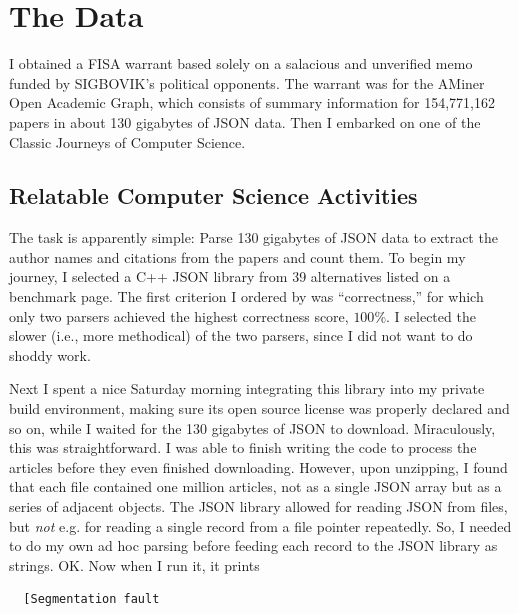 \documentclass[twocolumn]{article}
\begin{document}
\section{The Data}

I obtained a FISA warrant based solely on a salacious and unverified
memo funded by SIGBOVIK's political opponents. The warrant was for the
AMiner Open Academic Graph, which consists of summary information for
154,771,162 papers in about 130 gigabytes of JSON data. Then I embarked
on one of the Classic Journeys of Computer Science.

\subsection{Relatable Computer Science Activities}

The task is apparently simple: Parse 130 gigabytes of JSON data to
extract the author names and citations from the papers and count them.
To begin my journey, I selected a C++ JSON library from 39
alternatives listed on a benchmark page.\cite{yip2018native} The first
criterion I ordered by was ``correctness,'' for which only two parsers
achieved the highest correctness score, $100\%$. I selected the slower
(i.e., more methodical) of the two parsers, since I did not want to do
shoddy work.

Next I spent a nice Saturday morning integrating this library into my
private build environment, making sure its open source license was
properly declared and so on, while I waited for the 130 gigabytes of
JSON to download. Miraculously, this was straightforward. I was able
to finish writing the code to process the articles before they even
finished downloading. However, upon unzipping, I found that each file
contained one million articles, not as a single JSON array but as a
series of adjacent objects. The JSON library allowed for reading JSON
from files, but {\em not} e.g. for reading a single record from a file pointer
repeatedly. So, I needed to do my own ad hoc parsing before feeding
each record to the JSON library as strings. OK. Now when I run it, it
prints
\begin{verbatim}
  [Segmentation fault
\end{verbatim}
\end{document}
